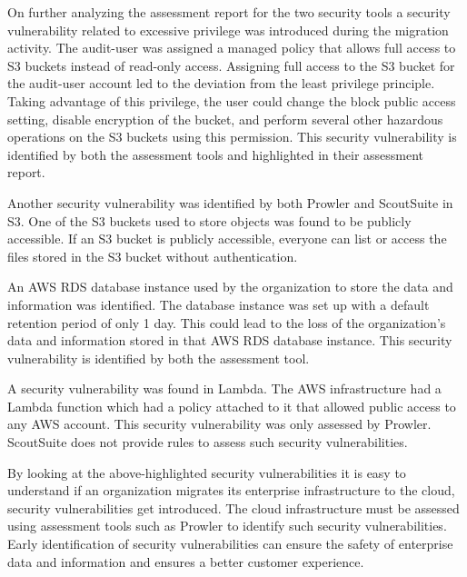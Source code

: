 \par On further analyzing the assessment report for the
two security tools a security vulnerability related to
excessive privilege was introduced during the migration
activity.
The audit-user was assigned a managed policy that allows full access to S3 buckets instead of read-only access.
Assigning full access to the S3 bucket for the audit-user account led to the deviation from the least privilege principle.
Taking advantage of this privilege, the user could change the block public access setting, disable encryption of the bucket, and perform several other hazardous operations on the S3 buckets using this permission.
This security vulnerability is identified by both the assessment tools and highlighted in their assessment report.

\par Another security vulnerability was identified by both Prowler and ScoutSuite in S3. One of the S3 buckets used to store objects was found to be publicly accessible.
If an S3 bucket is publicly accessible, everyone can list or access the files stored in the S3 bucket without authentication.

\par An AWS RDS database instance used by the organization to store the data and information was identified.
The database instance was set up with a default retention period of only 1 day.
This could lead to the loss of the organization’s data and information stored in that AWS RDS database instance.
This security vulnerability is identified by both the assessment tool.


\par A security vulnerability was found in Lambda.
The AWS infrastructure had a Lambda function which had a policy attached to it that allowed public access to any AWS account.
This security vulnerability was only assessed by Prowler.
ScoutSuite does not provide rules to assess such security vulnerabilities.

\par By looking at the above-highlighted security vulnerabilities it is easy to understand if an organization migrates its enterprise infrastructure to the cloud, security vulnerabilities get introduced.
The cloud infrastructure must be assessed using assessment tools such as Prowler to identify such security vulnerabilities.
Early identification of security vulnerabilities can ensure the safety of enterprise data and information and ensures a better customer experience.






